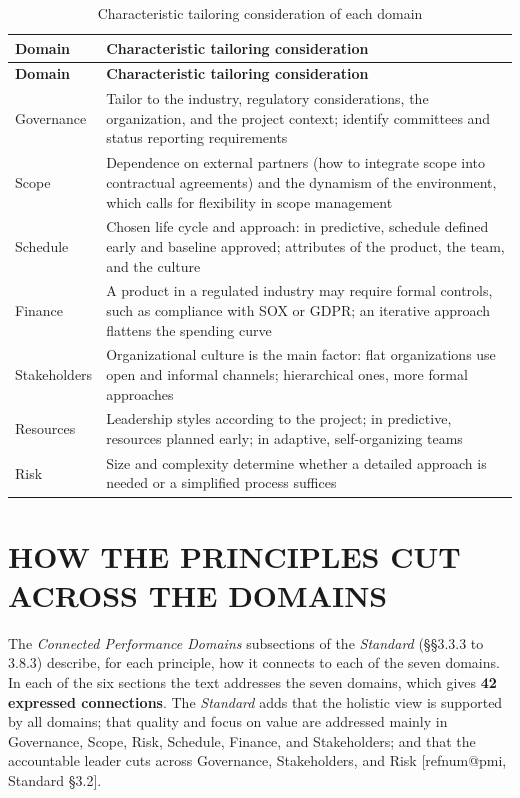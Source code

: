 \documentclass[12pt,a4paper,article,oneside,brazil,english]{abntex2}
\makeatletter
\newcommand{\fontetab}[1]{\par\vspace{3pt}{\small\noindent Source: #1\par}}
\newcommand{\refnum}[1]{\csname refnum@#1\endcsname}
\newcommand{\cit}[1]{[\refnum{#1}]}
\makeatother
\begin{document}
\begingroup\SingleSpacing\small
\begin{longtable}{@{}>{\raggedright\arraybackslash}p{}>{\raggedright\arraybackslash}p{}@{}}
\caption{Characteristic tailoring consideration of each domain}\label{tab:t9}\\
\hline
\textbf{Domain} & \textbf{Characteristic tailoring consideration}\\
\hline
\endfirsthead
\hline
\textbf{Domain} & \textbf{Characteristic tailoring consideration}\\
\hline
\endhead
\hline
\endfoot
\hline
\endlastfoot
Governance & Tailor to the industry, regulatory considerations, the organization, and the project context; identify committees and status reporting requirements\\[3pt]
Scope & Dependence on external partners (how to integrate scope into contractual agreements) and the dynamism of the environment, which calls for flexibility in scope management\\[3pt]
Schedule & Chosen life cycle and approach: in predictive, schedule defined early and baseline approved; attributes of the product, the team, and the culture\\[3pt]
Finance & A product in a regulated industry may require formal controls, such as compliance with SOX or GDPR; an iterative approach flattens the spending curve\\[3pt]
Stakeholders & Organizational culture is the main factor: flat organizations use open and informal channels; hierarchical ones, more formal approaches\\[3pt]
Resources & Leadership styles according to the project; in predictive, resources planned early; in adaptive, self-organizing teams\\[3pt]
Risk & Size and complexity determine whether a detailed approach is needed or a simplified process suffices\\[3pt]
\end{longtable}
\endgroup
\fontetab{Prepared by the authors (2026), based on \cit{pmi}.}

\section{HOW THE PRINCIPLES CUT ACROSS THE DOMAINS}

The \textit{Connected Performance Domains} subsections of the \textit{Standard} (§§3.3.3 to 3.8.3) describe, for each principle, how it connects to each of the seven domains. In each of the six sections the text addresses the seven domains, which gives \textbf{42 expressed connections}. The \textit{Standard} adds that the holistic view is supported by all domains; that quality and focus on value are addressed mainly in Governance, Scope, Risk, Schedule, Finance, and Stakeholders; and that the accountable leader cuts across Governance, Stakeholders, and Risk [\refnum{pmi}, Standard §3.2].
\end{document}
